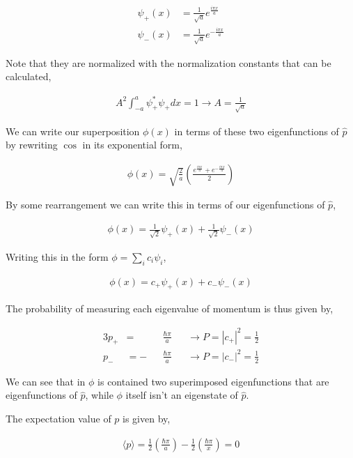\documentclass[11pt]{amsart}
\begin{document}
\begin{align*}
  \psi_+(x) &= \frac{1}{\sqrt{a}} e^{\frac{i\pi x}{a}} \\
  \psi_-(x) &= \frac{1}{\sqrt{a}} e^{-\frac{i\pi x}{a}}
\end{align*}

Note that they are normalized with the normalization constants that can be calculated,

\begin{align*}
  A^2 \int_{-a}^{a} \psi_+^* \psi_+ dx = 1 \to A = \frac{1}{\sqrt{a}}
\end{align*}

We can write our superposition $\phi(x)$ in terms of these two eigenfunctions of $\hat{p}$ by rewriting $\cos$ in its exponential form,

\begin{align*}
  \phi(x) = \sqrt{\frac{2}{a}} \left(\frac{e^{\frac{i\pi x}{a}} + e^{-\frac{i\pi x}{a}}}{2}\right)
\end{align*}

By some rearrangement we can write this in terms of our eigenfunctions of $\hat{p}$,

\begin{align*}
  \phi(x) = \frac{1}{\sqrt{2}} \psi_+(x) + \frac{1}{\sqrt{2}} \psi_-(x)
\end{align*}

Writing this in the form $\phi = \sum\limits_i c_i \psi_i$,

\begin{align*}
  \phi(x) = c_+ \psi_+(x) + c_- \psi_-(x)
\end{align*}

The probability of measuring each eigenvalue of momentum is thus given by,

\begin{alignat*}{3}
  p_+ &= &&\frac{\hbar\pi}{a}  &&\to P = {|c_+|}^2 = \frac{1}{2} \\
  p_- &= -&&\frac{\hbar\pi}{a} &&\to P = {|c_-|}^2 = \frac{1}{2}
\end{alignat*}

We can see that in $\phi$ is contained two superimposed eigenfunctions that are eigenfunctions of $\hat{p}$, while $\phi$ itself isn't an eigenstate of $\hat{p}$.

The expectation value of $p$ is given by,

\begin{align*}
  \langle p \rangle = \frac{1}{2}\left(\frac{\hbar\pi}{a}\right) - \frac{1}{2}\left(\frac{\hbar\pi}{x}\right) = 0
\end{align*}
\end{document}
